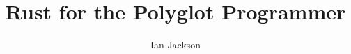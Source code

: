 \documentclass[a4paper]{memoir}
\title{Rust for the Polyglot Programmer}
\author{Ian Jackson}
\begin{document}
\pagestyle{plain}
\frontmatter

\begin{titlingpage}
  \maketitle
\end{titlingpage}

\tableofcontents

\pagestyle{headings}
\mainmatter















\backmatter

\end{document}
